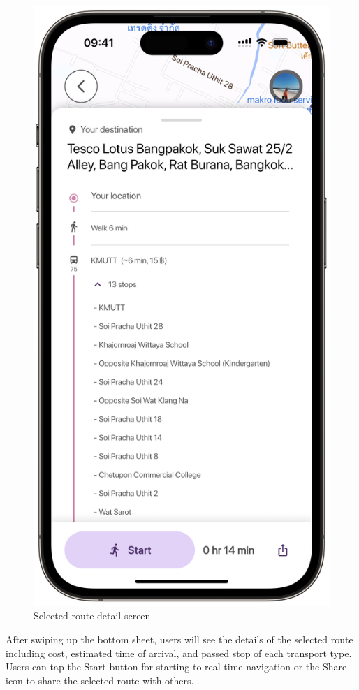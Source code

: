 \newpage
\begin{figure}[!h]
	\centering
	\includegraphics[width=0.5\linewidth]{chapter4/selected_route_detail_screen.png}
	\caption{Selected route detail screen}
	\label{fig:Selected route detail screen}
\end{figure}
After swiping up the bottom sheet, users will see the details of the selected route including cost, estimated time of arrival, and passed stop of each transport type. Users can tap the Start button for starting to real-time navigation or the Share icon to share the selected route with others.

